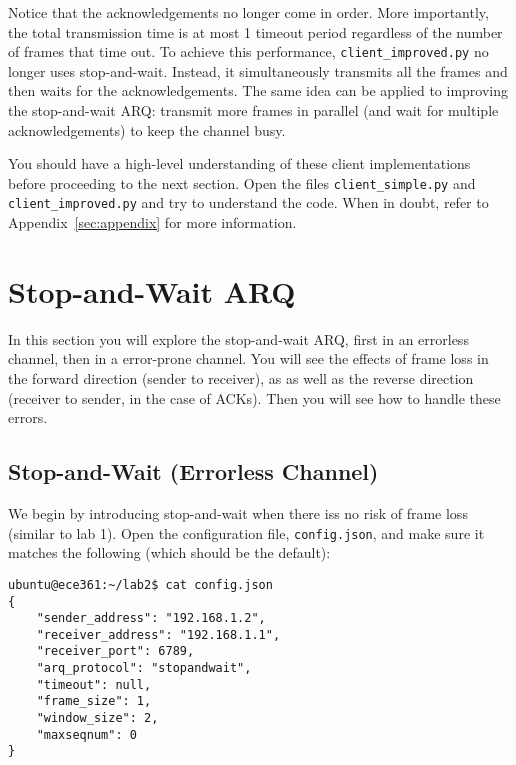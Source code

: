 \documentclass[11pt]{article}
\begin{document}
Notice that the acknowledgements no longer come in order.
More importantly, the total transmission time is at most 1 timeout period regardless of the number of frames that time out.
To achieve this performance, \texttt{client\_improved.py} no longer uses stop-and-wait.
Instead, it simultaneously transmits all the frames and then waits for the acknowledgements.
The same idea can be applied to improving the stop-and-wait ARQ: transmit more frames in parallel (and wait for multiple acknowledgements) to keep the channel busy.

You should have a high-level understanding of these client implementations before proceeding to the next section.
Open the files \texttt{client\_simple.py} and \texttt{client\_improved.py} and try to understand the code.
When in doubt, refer to Appendix~\ref{sec:appendix} for more information.

\section{Stop-and-Wait ARQ}
\label{sec:stop-and-wait}
In this section you will explore the stop-and-wait ARQ, first in an errorless channel, then in a error-prone channel.
You will see the effects of frame loss in the forward direction (sender to receiver), as as well as the reverse direction (receiver to sender, in the case of ACKs).
Then you will see how to handle these errors.

\subsection{Stop-and-Wait (Errorless Channel)}
We begin by introducing stop-and-wait when there iss no risk of frame loss (similar to lab 1).
Open the configuration file, \texttt{config.json}, and make sure it matches the following (which should be the default):
\begin{lstlisting}[style=ece361-shell-base, caption={Configuration For Small File}]
ubuntu@ece361:~/lab2$ cat config.json
{
    "sender_address": "192.168.1.2",
    "receiver_address": "192.168.1.1",
    "receiver_port": 6789,
    "arq_protocol": "stopandwait",
    "timeout": null,
    "frame_size": 1,
    "window_size": 2,
    "maxseqnum": 0
}
\end{lstlisting}
\end{document}
